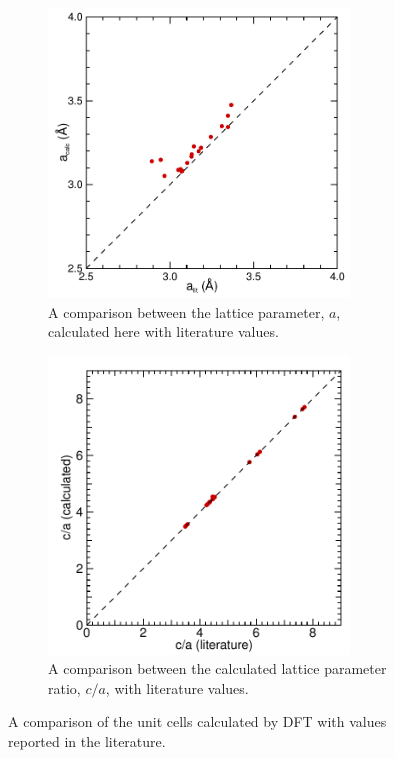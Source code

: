\begin{figure}
\begin{subfigure}{\textwidth}

\centering
\captionsetup{width=10cm}
\includegraphics[width=8cm]{a_calc_vs_a_lit}
\caption[Calculated lattice parameters compared with literature values]{A comparison between the lattice parameter, $a$, calculated here with literature values.\label{fig:latt_params_DFT_vs_lit}}

\end{subfigure}

\begin{subfigure}{\textwidth}
\centering
\captionsetup{width=10cm}
\includegraphics[width=8cm]{c-a_calc_vs_lit}
\caption{A comparison between the calculated lattice parameter ratio, $c/a$, with literature values.\label{fig:c_a_ratio_DFT_vs_lit}}
\end{subfigure}

\caption{A comparison of the unit cells calculated by DFT with values reported in the literature.\label{fig:unit_cells_DFT_vs_literature}}
\end{figure}



